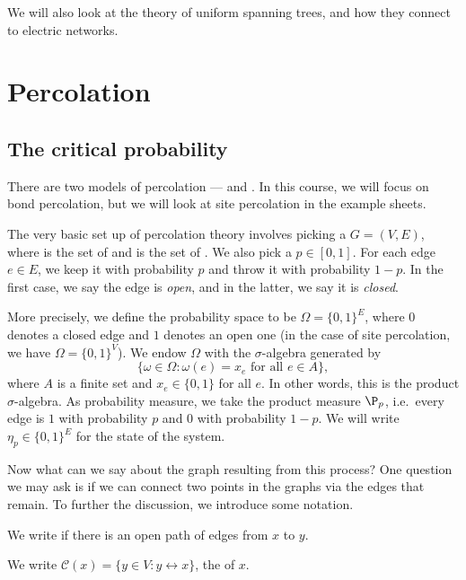 \documentclass[a4paper]{article}
\begin{document}
We will also look at the theory of uniform spanning trees, and how they connect to electric networks.

\section{Percolation}
\subsection{The critical probability}
There are two models of percolation ---  and . In this course, we will focus on bond percolation, but we will look at site percolation in the example sheets.

The very basic set up of percolation theory involves picking a  $G = (V, E)$, where  is the set of  and  is the set of . We also pick a  $p \in [0, 1]$. For each edge $e \in E$, we keep it with probability $p$ and throw it with probability $1 - p$. In the first case, we say the edge is \emph{open}, and in the latter, we say it is \emph{closed}.

More precisely, we define the probability space to be $\Omega= \{0, 1\}^E$, where $0$ denotes a closed edge and $1$ denotes an open one (in the case of site percolation, we have $\Omega = \{0, 1\}^V$). We endow $\Omega$ with the $\sigma$-algebra generated by 
\[
  \{\omega \in \Omega: \omega(e) = x_e \text{ for all }e \in A\},
\]
where $A$ is a finite set and $x_e \in \{0, 1\}$ for all $e$. In other words, this is the product $\sigma$-algebra. As probability measure, we take the product measure $\P_p$, i.e.\ every edge is $1$ with probability $p$ and $0$ with probability $1 - p$. We will write $\eta_p \in \{0, 1\}^E$ for the state of the system.

Now what can we say about the graph resulting from this process? One question we may ask is if we can connect two points in the graphs via the edges that remain. To further the discussion, we introduce some notation.

\begin{notation}
  We write  if there is an open path of edges from $x$ to $y$.
\end{notation}

\begin{notation}
  We write $\mathcal{C}(x) = \{y \in V: y \leftrightarrow x\}$, the  of $x$.
\end{notation}
\end{document}
